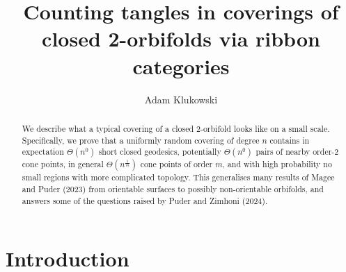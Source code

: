 \documentclass{amsart}
\author{Adam Klukowski}
\begin{document}
\title[Counting tangles]{Counting tangles in coverings of closed 2-orbifolds via ribbon categories}

\begin{abstract}
We describe what a typical covering of a closed 2-orbifold looks like on a small scale. Specifically, we prove that a uniformly random covering of degree $n$ contains in expectation $\Theta(n^0)$ short closed geodesics, potentially $\Theta(n^0)$ pairs of nearby order-2 cone points, in general $\Theta(n^{\frac{1}{m}})$ cone points of order $m$, and with high probability no small regions with more complicated topology. This generalises many results of Magee and Puder (2023) from orientable surfaces to possibly non-orientable orbifolds, and answers some of the questions raised by Puder and Zimhoni (2024).
\end{abstract}

\maketitle

\section{Introduction}\label{sec:intro}
\end{document}
